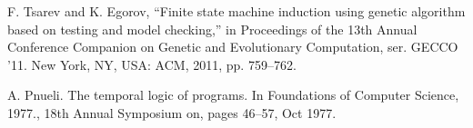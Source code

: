 \documentclass[14pt]{extarticle}
\theoremstyle{plain}
\theoremstyle{definition}
\begin{document}
\begin{thebibliography}{99}
F. Tsarev and K. Egorov, “Finite state machine induction using genetic
algorithm based on testing and model checking,” in Proceedings of
the 13th Annual Conference Companion on Genetic and Evolutionary
Computation, ser. GECCO ’11. New York, NY, USA: ACM, 2011, pp.
759–762.

A. Pnueli. The temporal logic of programs. In Foundations of Computer Science, 1977., 18th Annual Symposium on, pages 46–57, Oct 1977.

\end{thebibliography}
\end{document}
